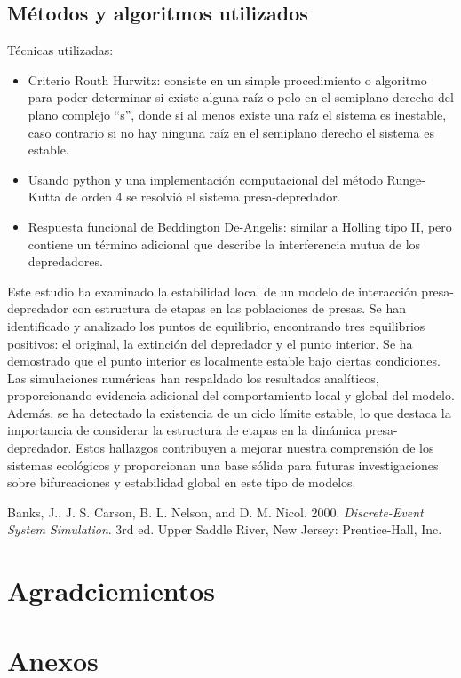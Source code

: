 \documentclass{wscpaperproc}
\theoremstyle{wsc}
\begin{document}
\subsection{Métodos y algoritmos utilizados}
Técnicas utilizadas:
\begin{itemize}
	\item Criterio Routh Hurwitz: consiste en un simple procedimiento o algoritmo para poder determinar si existe alguna raíz o polo en el semiplano derecho del
	      plano complejo “s”, donde si al menos existe una raíz el sistema es inestable, caso contrario si no hay ninguna raíz en el semiplano derecho el sistema es estable.
	\item Usando python y una implementación computacional del método Runge-Kutta de orden 4 se resolvió el sistema presa-depredador.
	\item Respuesta funcional de Beddington De-Angelis: similar a Holling tipo II, pero contiene un término adicional que describe la interferencia mutua de los depredadores.
\end{itemize}

Este estudio ha examinado la estabilidad local de un modelo de interacción presa-depredador con estructura
de etapas en las poblaciones de presas. Se han identificado y analizado los puntos de equilibrio,
encontrando tres equilibrios positivos: el original, la extinción del depredador y el punto interior.
Se ha demostrado que el punto interior es localmente estable bajo ciertas condiciones. Las simulaciones
numéricas han respaldado los resultados analíticos, proporcionando evidencia adicional del comportamiento
local y global del modelo. Además, se ha detectado la existencia de un ciclo límite estable, lo que destaca
la importancia de considerar la estructura de etapas en la dinámica presa-depredador. Estos hallazgos
contribuyen a mejorar nuestra comprensión de los sistemas ecológicos y proporcionan una base sólida para
futuras investigaciones sobre bifurcaciones y estabilidad global en este tipo de modelos.


	{\footnotesize
		\begin{hangref}
			\item Banks, J., J. S. Carson, B. L. Nelson, and D. M. Nicol. 2000. \textit{Discrete-Event System Simulation}. 3rd ed. Upper Saddle River, New Jersey: Prentice-Hall, Inc.
		\end{hangref}
	}




% 
% 




\section*{Agradciemientos}



\section{Anexos}
\end{document}
